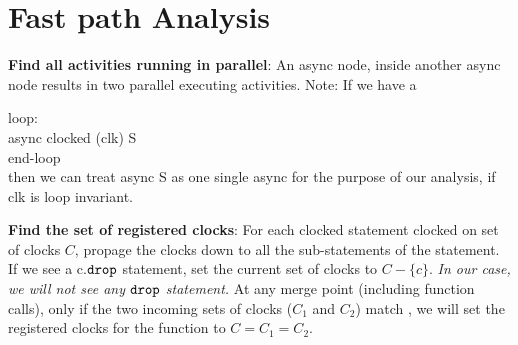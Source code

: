 \documentclass{article}
\def\drop{\mbox{\tt drop}}
\begin{document}
\section{Fast path Analysis}

{\bf Find all activities running in parallel}:
An async node, inside another async node results in two parallel executing
activities. 
Note: If we have a 

\noindent
loop:\\
async clocked (clk) S\\
end-loop\\

then we can treat async S as one single async for the purpose of our
analysis, if clk is loop invariant.

{\bf Find the set of registered clocks}: For each clocked statement
clocked on set of clocks $C$,
propage the clocks down to all the sub-statements of the statement. 
If we see a c.$\drop$ statement, set the current set of clocks to
$C-\{c\}$. {\em In our case, we will not see any $\drop$ statement.}
At any merge point (including function calls), only if the two incoming
sets of clocks ($C_1$ and $C_2$) match , we will set the registered clocks
for the function to $C = C_1 = C_2$.
        
\end{document}
